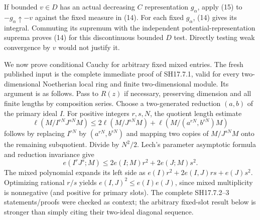 \documentclass[
  11pt,
]{article}
\begin{document}
If bounded \(v\in D\) has an actual decreasing \(C\) representation
\(g_\alpha\), apply (15) to \(-g_\alpha\uparrow-v\) against the fixed
measure in (14). For each fixed \(g_\alpha\), (14) gives its integral.
Commuting its supremum with the independent potential-representation
suprema proves (14) for this discontinuous bounded \(D\) test. Directly
testing weak convergence by \(v\) would not justify it.

We now prove conditional Cauchy for arbitrary fixed mixed entries. The
fresh published input is the complete immediate proof of SH17.7.1, valid
for every two-dimensional Noetherian local ring and finite
two-dimensional module. Its argument is as follows. Pass to \(R(z)\) if
necessary, preserving dimension and all finite lengths by composition
series. Choose a two-generated reduction \((a,b)\) of the primary ideal
\(I\). For positive integers \(r,s,N\), the quotient length estimate
\[\ell(M/I^{rN}J^{sN}M)\le2\ell(M/J^{sN}M)+\ell(M/(a^{rN},b^{rN})M)\]
follows by replacing \(I^{rN}\) by \((a^{rN},b^{rN})\) and mapping two
copies of \(M/J^{sN}M\) onto the remaining subquotient. Divide by
\(N^2/2\). Lech's parameter asymptotic formula and reduction invariance
give \[e(I^rJ^s;M)\le2e(I;M)r^2+2e(J;M)s^2.\] The mixed polynomial
expands its left side as \(e(I)r^2+2e(I,J)rs+e(J)s^2\). Optimizing
rational \(r/s\) yields \(e(I,J)^2\le e(I)e(J)\), since mixed
multiplicity is nonnegative (and positive for primary slots). The
complete SH17.7.2--3 statements/proofs were checked as context; the
arbitrary fixed-slot result below is stronger than simply citing their
two-ideal diagonal sequence.
\end{document}
